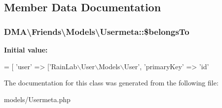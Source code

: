\subsection{Member Data Documentation}
\hypertarget{classDMA_1_1Friends_1_1Models_1_1Usermeta_a93ae6777a48086374de412273d1d092e}{
\subsubsection[{\$belongs\-To}]{\setlength{\rightskip}{0pt plus 5cm}D\-M\-A\textbackslash{}\-Friends\textbackslash{}\-Models\textbackslash{}\-Usermeta\-::\$belongs\-To}}\label{classDMA_1_1Friends_1_1Models_1_1Usermeta_a93ae6777a48086374de412273d1d092e}
{\bfseries Initial value\-:}
\begin{DoxyCode}
= [
        \textcolor{stringliteral}{'user'}          => [\textcolor{stringliteral}{'RainLab\(\backslash\)User\(\backslash\)Models\(\backslash\)User'},
            \textcolor{stringliteral}{'primaryKey'}    => \textcolor{stringliteral}{'id'}
\end{DoxyCode}


The documentation for this class was generated from the following file\-:\begin{DoxyCompactItemize}
\item 
models/Usermeta.\-php\end{DoxyCompactItemize}
